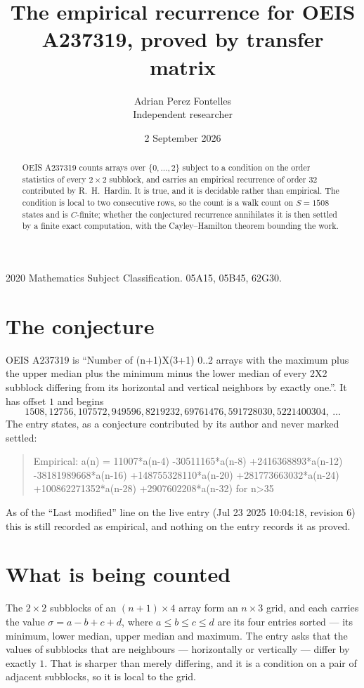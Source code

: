 \documentclass[11pt,a4paper]{article}
\title{The empirical recurrence for OEIS A237319, proved by transfer matrix}
\author{Adrian Perez Fontelles\\ \small Independent researcher}
\date{2 September 2026}
\theoremstyle{plain}
\theoremstyle{definition}
\begin{document}
\maketitle

\begin{abstract}
OEIS A237319 counts arrays over $\{0,\dots,2\}$ subject to a condition on the order
statistics of every $2\times2$ subblock, and carries an empirical recurrence of order
$32$ contributed by R.~H.~Hardin. It is true, and it is decidable rather than empirical.
The condition is local to two consecutive rows, so the count is a walk count on $S=1508$
states and is $C$-finite; whether the conjectured recurrence annihilates it is then settled by
a finite exact computation, with the Cayley--Hamilton theorem bounding the work.
\end{abstract}

\noindent\small 2020 Mathematics Subject Classification. 05A15, 05B45, 62G30.\normalsize

\section{The conjecture}

OEIS A237319 is ``Number of (n+1)X(3+1) 0..2 arrays with the maximum plus the upper median plus the minimum minus the lower median of every 2X2 subblock differing from its horizontal and vertical neighbors by exactly one.''. It has offset $1$ and begins
\[
1508, 12756, 107572, 949596, 8219232, 69761476, 591728030, 5221400304,\ \dots
\]
The entry states, as a conjecture contributed by its author and never marked settled:
\begin{quote}
Empirical: a(n) = 11007*a(n-4) -30511165*a(n-8) +2416368893*a(n-12) -38181989668*a(n-16) +148755328110*a(n-20) +281773663032*a(n-24) +100862271352*a(n-28) +2907602208*a(n-32) for n>35
\end{quote}
As of the ``Last modified'' line on the live entry (Jul 23 2025 10:04:18, revision 6) this is still
recorded as empirical, and nothing on the entry records it as proved.

\section{What is being counted}

The $2\times2$ subblocks of an $(n+1)\times4$ array form an
$n\times3$ grid, and each carries the value $\sigma=a-b+c+d$, where $a\le b\le c\le d$ are its four entries sorted --- its minimum, lower median, upper median and maximum. The entry asks that the values of
subblocks that are neighbours --- horizontally or vertically --- differ by exactly $1$.
That is sharper than merely differing, and it is a condition on a pair of adjacent subblocks,
so it is local to the grid.
\end{document}
